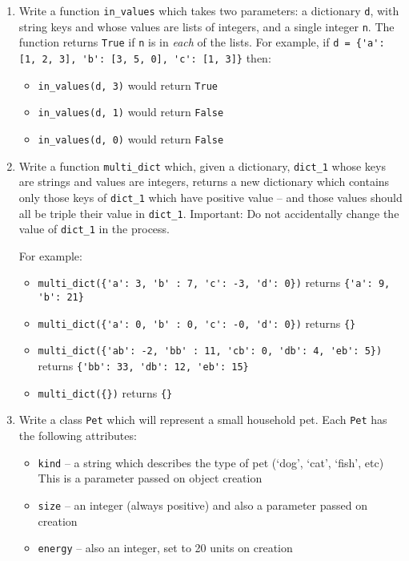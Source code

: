 \documentclass{article}
\begin{document}
\begin{enumerate}
\item Write a function \verb|in_values| which takes two parameters: a dictionary \verb|d|, with string keys and whose values are lists of integers, and a single integer \verb|n|. The function returns \verb|True| if \verb|n| is in \emph{each} of the lists.  For example,  if \verb|d = {'a': [1, 2, 3], 'b': [3, 5, 0], 'c': [1, 3]}| then:
      \begin{itemize}
        \item \verb|in_values(d, 3)| would return \verb|True|
        \item \verb|in_values(d, 1)| would return \verb|False|
        \item \verb|in_values(d, 0)| would return \verb|False|
      \end{itemize}

\item Write a function \verb|multi_dict| which, given a dictionary, \verb|dict_1| whose keys are strings and values are integers, returns a new dictionary which contains only those keys of \verb|dict_1| which have positive value -- and those values should all be triple their value in \verb|dict_1|. Important: Do not accidentally change the value of \verb|dict_1| in the process.

    For example:
    \begin{itemize}
      \item \verb|multi_dict({'a': 3, 'b' : 7, 'c': -3, 'd': 0})| returns \verb|{'a': 9, 'b': 21}|
      \item \verb|multi_dict({'a': 0, 'b' : 0, 'c': -0, 'd': 0})| returns \verb|{}|
      \item \verb|multi_dict({'ab': -2, 'bb' : 11, 'cb': 0, 'db': 4, 'eb': 5})| returns \verb|{'bb': 33, 'db': 12, 'eb': 15}|
      \item \verb|multi_dict({})| returns \verb|{}|
    \end{itemize}

\item Write a class \verb|Pet| which will represent a small household pet. Each \verb|Pet| has the following attributes:

\begin{itemize}
  \item \verb|kind| -- a string which describes the type of pet (`dog', `cat', `fish', etc) This is a parameter passed on object creation
  \item \verb|size| -- an integer (always positive) and also a parameter passed on creation
  \item \verb|energy| -- also an integer, set to 20 units on creation
\end{itemize}


\end{enumerate}
\end{document}
